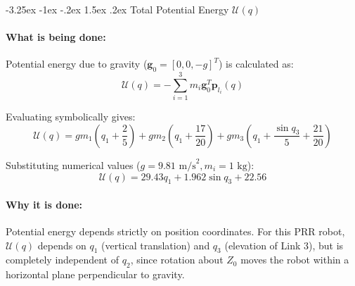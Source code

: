 \documentclass[11pt, a4paper]{article}
\makeatletter
\renewcommand{\subsection}{\@startsection{subsection}{2}{\z@}%
    {-3.25ex \@plus -1ex \@minus -.2ex}%
    {1.5ex \@plus .2ex}%
    {\normalfont\large\bfseries\color{brandaccent}}}
\makeatother
\begin{document}
\subsection{Total Potential Energy \texorpdfstring{$\mathcal{U}(q)$}{U(q)}}
\paragraph{What is being done:}
Potential energy due to gravity ($\mathbf{g}_0 = [0, 0, -g]^T$) is calculated as:
\begin{equation}
    \mathcal{U}(q) = -\sum_{i=1}^{3} m_i \mathbf{g}_0^T \mathbf{p}_{l_i}(q)
\end{equation}

Evaluating symbolically gives:
\begin{equation}
    \mathcal{U}(q) = g m_1 \left(q_1 + \frac{2}{5}\right) + g m_2 \left(q_1 + \frac{17}{20}\right) + g m_3 \left(q_1 + \frac{\sin q_3}{5} + \frac{21}{20}\right)
\end{equation}

Substituting numerical values ($g = 9.81\text{ m/s}^2, m_i = 1\text{ kg}$):
\begin{equation}
    \mathcal{U}(q) = 29.43 q_1 + 1.962 \sin q_3 + 22.56
\end{equation}

\paragraph{Why it is done:}
Potential energy depends strictly on position coordinates. For this PRR robot, $\mathcal{U}(q)$ depends on $q_1$ (vertical translation) and $q_3$ (elevation of Link 3), but is completely independent of $q_2$, since rotation about $Z_0$ moves the robot within a horizontal plane perpendicular to gravity.
\end{document}
